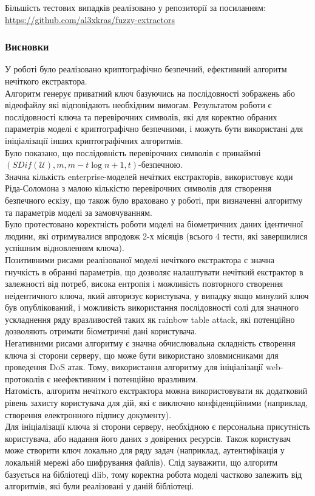 \documentclass[11pt]{article}
\begin{document}
Більшість тестових випадків реалізовано у репозиторії за посиланням:\\
\url{https://github.com/al3xkras/fuzzy-extractors}

    \hypertarget{ux432ux438ux441ux43dux43eux432ux43aux438}{%
\subsubsection{Висновки}\label{ux432ux438ux441ux43dux43eux432ux43aux438}}

У роботі було реалізовано криптографічно безпечний, ефективний алгоритм
нечіткого екстрактора.\\
Алгоритм генерує приватний ключ базуючись на послідовності зображень або
відеофайлу які відповідають необхідним вимогам. Результатом роботи є
послідовності ключа та перевірочних символів, які для коректно обраних
параметрів моделі є криптографічно безпечними, і можуть бути використані
для ініціалізації інших криптографічних алгоритмів.\\
Було показано, що послідовність перевірочних символів є принаймні
\((SDif(\mathscr{U}),m,m-t\log{n+1},t)\)-безпечною.\\
Значна кількість enterprise-моделей нечітких екстракторів, використовує
коди Ріда-Соломона з малою кількістю перевірочних символів для створення
безпечного ескізу, що також було враховано у роботі, при визначенні
алгоритму та параметрів моделі за замовчуванням.\\
Було протестовано коректність роботи моделі на біометричних даних
ідентичної людини, які отримувалися впродовж 2-х місяців (всього 4
тести, які завершилися успішним відновленням ключа).\\
Позитивними рисами реалізованої моделі нечіткого екстрактора є значна
гнучкість в обранні параметрів, що дозволяє налаштувати нечіткий
екстрактор в залежності від потреб, висока ентропія і можливість
повторного створення неідентичного ключа, який авторизує користувача, у
випадку якщо минулий ключ був опублікований, і можливість використання
послідовності солі для значного ускладнення ряду вразливостей таких як
rainbow table attack, які потенційно дозволяють отримати біометричні
дані користувача.\\
Негативними рисами алгоритму є значна обчислювальна складність створення
ключа зі сторони серверу, що може бути використано зловмисниками для
проведення DoS атак. Тому, використання алгоритму для ініціалізації
web-протоколів є неефективним і потенційно вразливим.\\
Натомість, алгоритм нечіткого екстрактора можна використовувати як
додатковий рівень захисту користувача для дій, які є виключно
конфіденційними (наприклад, створення електронного підпису документу).\\
Для ініціалізації ключа зі сторони серверу, необхідною є персональна
присутність користувача, або надання його даних з довірених ресурсів.
Також користувач може створити ключ локально для ряду задач (наприклад,
аутентифікація у локальній мережі або шифрування файлів). Слід
зауважити, що алгоритм базується на бібліотеці dlib, тому коректна
робота моделі частково залежить від алгоритмів, які були реалізовані у
даній бібліотеці.
\end{document}

